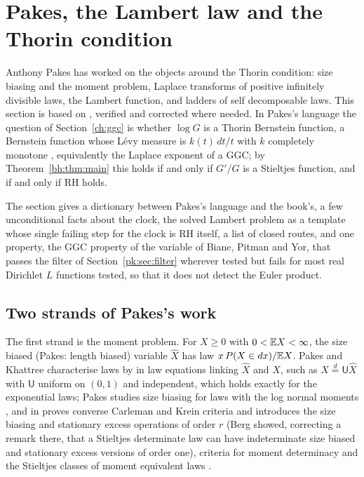 \section{Pakes, the Lambert law and the Thorin condition}\label{sec:pakes}

Anthony Pakes has worked on the objects around the Thorin condition: size biasing and the moment problem, Laplace transforms of positive infinitely divisible laws, the Lambert function, and ladders of self decomposable laws. This section is based on \cite{P26pak}, verified and corrected where needed. In Pakes's language the question of Section~\ref{ch:ggc} is whether $\log G$ is a Thorin Bernstein function, a Bernstein function whose L\'evy measure is $k(t)\,dt/t$ with $k$ completely monotone \cite[Chapter 8]{boSSV}, equivalently the Laplace exponent of a GGC; by Theorem~\ref{bh:thm:main} this holds if and only if $G'/G$ is a Stieltjes function, and if and only if RH holds.

The section gives a dictionary between Pakes's language and the book's, a few unconditional facts about the clock, the solved Lambert problem as a template whose single failing step for the clock is RH itself, a list of closed routes, and one property, the GGC property of the variable of Biane, Pitman and Yor, that passes the filter of Section~\ref{pk:sec:filter} wherever tested but fails for most real Dirichlet $L$ functions tested, so that it does not detect the Euler product.

\subsection{Two strands of Pakes's work}\label{pk:sec:strands}

The first strand is the moment problem. For $X\ge0$ with $0<\mathbb{E} X<\infty$, the size biased (Pakes: length biased) variable $\widehat X$ has law $x\,P(X\in dx)/\mathbb{E} X$. Pakes and Khattree \cite{PK92} characterise laws by in law equations linking $\widehat X$ and $X$, such as $X\stackrel d=\mathsf U\widehat X$ with $\mathsf U$ uniform on $(0,1)$ and independent, which holds exactly for the exponential laws; Pakes studies size biasing for laws with the log normal moments \cite{Pakes96}, and in \cite{Pakes01} proves converse Carleman and Krein criteria and introduces the size biasing and stationary excess operations of order $r$ (Berg \cite{Berg04} showed, correcting a remark there, that a Stieltjes determinate law can have indeterminate size biased and stationary excess versions of order one), criteria for moment determinacy \cite{PHW01} and the Stieltjes classes of moment equivalent laws \cite{Pakes07}.

